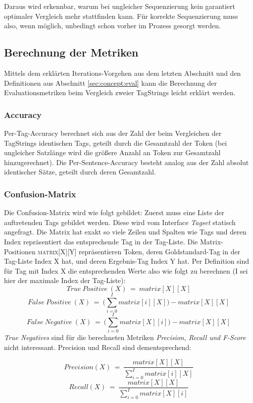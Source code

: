 Daraus wird erkennbar, warum bei ungleicher Sequenzierung kein garantiert optimaler Vergleich mehr stattfinden kann. Für korrekte Sequenzierung muss also, wenn möglich, unbedingt schon vorher im Prozess gesorgt werden.

\subsection{Berechnung der Metriken}
\label{sec:impl:eval:calc}

Mittels dem erklärten Iterations-Vorgehen aus dem letzten Abschnitt und den Definitionen aus Abschnitt \ref{sec:concept:eval} kann die Berechnung der Evaluationsmetriken beim Vergleich zweier TagStrings leicht erklärt werden.

\subsubsection{Accuracy}
Per-Tag-Accuracy berechnet sich aus der Zahl der beim Vergleichen der TagStrings identischen Tags, geteilt durch die Gesamtzahl der Token (bei ungleicher Satzlänge wird die größere Anzahl an Token zur Gesamtzahl hinzugerechnet). Die Per-Sentence-Accuracy besteht analog aus der Zahl absolut identischer Sätze, geteilt durch deren Gesamtzahl.

\subsubsection{Confusion-Matrix}
Die Confusion-Matrix wird wie folgt gebildet: Zuerst muss eine Liste der auftretenden Tags gebildet werden. Diese wird vom Interface \textit{Tagset} statisch angefragt. Die Matrix hat exakt so viele Zeilen und Spalten wie Tags und deren Index repräsentiert das entsprechende Tag in der Tag-Liste. Die Matrix-Positionen \textsc{matrix[X][Y]} repräsentieren Token, deren Goldstandard-Tag in der Tag-Liste Index X hat, und deren Ergebnis-Tag Index Y hat. Per Definition sind für Tag mit Index X die entsprechenden Werte also wie folgt zu berechnen (\textsc{I} sei hier der maximale Index der Tag-Liste):
\[True\: Positive\:(X)\:=\: matrix[X][X]\]
\[False\: Positive\:(X)\:=\: \Bigg(\sum_{i=0}^I matrix[i][X]\Bigg) - matrix[X][X] \]
\[False\: Negative\:(X)\:=\: \Bigg(\sum_{i=0}^I matrix[X][i]\Bigg) - matrix[X][X] \]
\textit{True Negatives} sind für die berechneten Metriken \textit{Precision, Recall und F-Score} nicht interessant. Precision und Recall sind dementsprechend:

\[Precision(X) \:=\: \frac{matrix[X][X]}{\sum_{i=0}^I matrix[i][X]}\]
\[Recall(X) \:=\: \frac{matrix[X][X]}{\sum_{i=0}^I matrix[X][i]}\]
 
